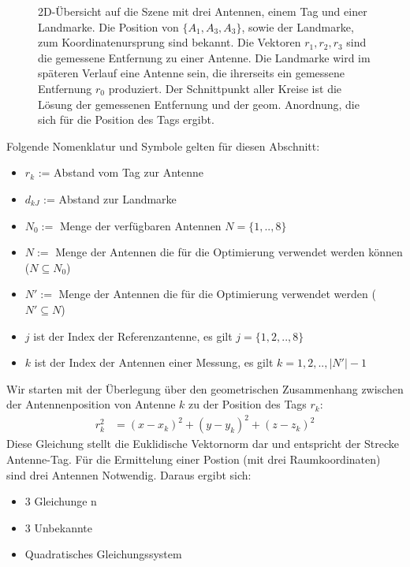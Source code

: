 \begin{figure}
	\begin{center}
		\caption[Antennen-Szene mit einem Tag]{2D-Übersicht auf die Szene mit drei Antennen, einem Tag und einer Landmarke. Die Position von $\{A_1,A_3,A_3\}$, sowie der Landmarke, zum Koordinatenursprung sind bekannt. Die Vektoren $r_1,r_2,r_3$ sind die gemessene Entfernung zu einer Antenne. Die Landmarke wird im späteren Verlauf eine Antenne sein, die ihrerseits ein gemessene Entfernung $r_0$ produziert. Der Schnittpunkt aller Kreise ist die Lösung der gemessenen Entfernung und der geom. Anordnung, die sich für die Position des Tags ergibt.} 
		\label{fig:TrilaterationScene}
		
		
	\end{center}
\end{figure}
%
Folgende Nomenklatur und Symbole gelten für diesen Abschnitt:
\begin{itemize}[itemsep=0mm]
	\item	$r_{k}$ := Abstand vom Tag zur Antenne
	\item	$d_{kJ}$ := Abstand zur Landmarke
	\item	$N_0:=$ Menge der verfügbaren Antennen $N=\{1,..,8\}$
	\item	$N:=$ Menge der Antennen die für die Optimierung verwendet werden können ($N \subseteq N_0$)
	\item	$N':=$ Menge der Antennen die für die Optimierung verwendet werden ($N' \subseteq N$)
	\item	$j$ ist der Index der Referenzantenne, es gilt $j = \{1,2,..,8\}$
	\item	$k$ ist der Index der Antennen einer Messung, es gilt $k = 1,2,..,|N'|-1$
\end{itemize}
%
Wir starten mit der Überlegung über den geometrischen Zusammenhang zwischen der Antennenposition von Antenne $k$ zu der Position des Tags $r_k$:
\begin{align}
	\label{eq:base_vactor}
	r_{k}^2 &= (x-x_k)^2+(y-y_k)^2+(z-z_k)^2
\end{align}
%
Diese Gleichung stellt die Euklidische Vektornorm dar und entspricht der Strecke Antenne-Tag. Für die Ermittelung einer Postion (mit drei Raumkoordinaten) sind drei Antennen Notwendig. Daraus ergibt sich:
%
\begin{itemize}
\item 3 Gleichunge n
\item 3 Unbekannte
\item Quadratisches Gleichungssystem
\end{itemize}
